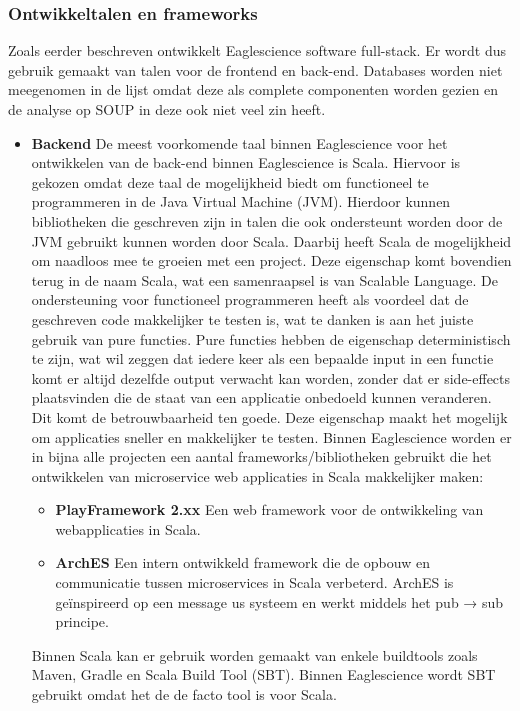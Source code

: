\subsubsection{Ontwikkeltalen en frameworks}\label{subsubsec:ontwikkeltalen-en-frameworks}
Zoals eerder beschreven ontwikkelt Eaglescience software full-stack. Er wordt dus gebruik gemaakt van talen voor de frontend en back-end. Databases worden niet meegenomen in de lijst omdat deze als complete componenten worden gezien en de analyse op SOUP in deze ook niet veel zin heeft.
\begin{itemize}
    \item \textbf{Backend} De meest voorkomende taal binnen Eaglescience voor het ontwikkelen van de back-end binnen Eaglescience is Scala. Hiervoor is gekozen omdat deze taal de mogelijkheid biedt om functioneel te programmeren in de Java Virtual Machine (JVM). Hierdoor kunnen bibliotheken die geschreven zijn in talen die ook ondersteunt worden door de JVM gebruikt kunnen worden door Scala. Daarbij heeft Scala de mogelijkheid om naadloos mee te groeien met een project. Deze eigenschap komt bovendien terug in de naam Scala, wat een samenraapsel is van Scalable Language. De ondersteuning voor functioneel programmeren heeft als voordeel dat de geschreven code makkelijker te testen is, wat te danken is aan het juiste gebruik van pure functies. Pure functies hebben de eigenschap deterministisch te zijn, wat wil zeggen dat iedere keer als een bepaalde input in een functie komt er altijd dezelfde output verwacht kan worden, zonder dat er side-effects plaatsvinden die de staat van een applicatie onbedoeld kunnen veranderen. Dit komt de betrouwbaarheid ten goede. Deze eigenschap maakt het mogelijk om applicaties sneller en makkelijker te testen. Binnen Eaglescience worden er in bijna alle projecten een aantal frameworks/bibliotheken gebruikt die het ontwikkelen van microservice web applicaties in Scala makkelijker maken:
    \begin{itemize}
        \item \textbf{PlayFramework 2.xx} Een web framework voor de ontwikkeling van webapplicaties in Scala.
        \item \textbf{ArchES} Een intern ontwikkeld framework die de opbouw en communicatie tussen microservices in Scala verbeterd. ArchES is geïnspireerd op een message us systeem en werkt middels het pub → sub principe.
    \end{itemize} Binnen Scala kan er gebruik worden gemaakt van enkele buildtools zoals Maven, Gradle en Scala Build Tool (SBT). Binnen Eaglescience wordt SBT gebruikt omdat het de de facto tool is voor Scala.

\end{itemize}
